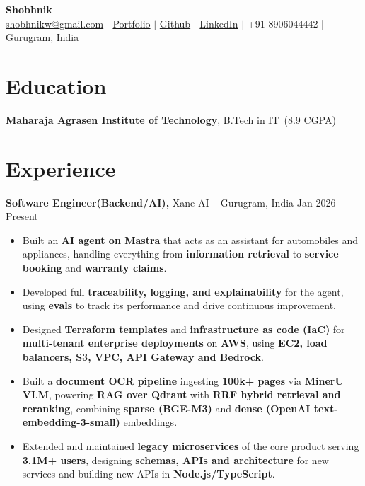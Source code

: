 \documentclass[10pt,a4paper]{article}
\newcommand{\resumeheader}[6]{%
    {\centering
        {\Large \textbf{#1}}\\[4pt]
        \href{mailto:#2}{#2} $|$ 
        \href{#3}{Portfolio} $|$ 
        \href{#4}{Github} $|$ 
        \href{#5}{LinkedIn} $|$ 
        #6\par}
}
\newcommand{\education}[4]{%
    \textbf{#1}, #2\ (#3) \hfill #4
}
\newcommand{\experience}[4]{%
    \textbf{#1,} #2 -- #3 \hfill #4
}
\begin{document}
\resumeheader{Shobhnik}
{shobhnikw@gmail.com}
{https://shobhnik.site}
{https://github.com/shobhnik13}
{https://www.linkedin.com/in/shobhnik13/}
{+91-8906044442 | Gurugram, India}

\section{Education}
\education{Maharaja Agrasen Institute of Technology}{B.Tech in IT}{8.9 CGPA}{}

\section{Experience}

\experience{Software Engineer(Backend/AI)}{Xane AI}{Gurugram, India}{Jan 2026 -- Present}
\begin{itemize}[leftmargin=20pt]

\item Built an \textbf{AI agent on Mastra} that acts as an assistant for automobiles and appliances, handling everything from \textbf{information retrieval} to \textbf{service booking} and \textbf{warranty claims}.

\item Developed full \textbf{traceability, logging, and explainability} for the agent, using \textbf{evals} to track its performance and drive continuous improvement.

\item Designed \textbf{Terraform templates} and \textbf{infrastructure as code (IaC)} for \textbf{multi-tenant enterprise deployments} on \textbf{AWS}, using \textbf{EC2, load balancers, S3, VPC, API Gateway and Bedrock}.

\item Built a \textbf{document OCR pipeline} ingesting \textbf{100k+ pages} via \textbf{MinerU VLM}, powering \textbf{RAG over Qdrant} with \textbf{RRF hybrid retrieval and reranking}, combining \textbf{sparse (BGE-M3)} and \textbf{dense (OpenAI text-embedding-3-small)} embeddings.

\item Extended and maintained \textbf{legacy microservices} of the core product serving \textbf{3.1M+ users}, designing \textbf{schemas, APIs and architecture} for new services and building new APIs in \textbf{Node.js/TypeScript}.
\end{itemize}
\end{document}
